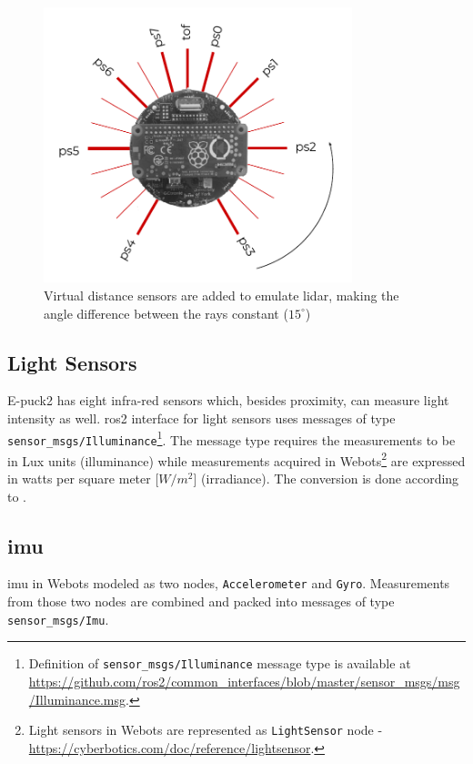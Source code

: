 \begin{figure}[H]
    \centering
    \includegraphics[width=0.8\textwidth]{simulation/figures/laserscan.pdf}
    \caption{Virtual distance sensors are added to emulate \ac{lidar}, making the angle difference between the rays constant ($15^\circ$)}
    \label{fig:simulation:laserscan}
\end{figure}

\subsection{Light Sensors}
E-puck2 has eight infra-red sensors which, besides proximity, can measure light intensity as well.
\ac{ros2} interface for light sensors uses messages of type \texttt{sensor\_msgs/Illuminance}\footnote{Definition of \texttt{sensor\_msgs/Illuminance} message type is available at \url{https://github.com/ros2/common_interfaces/blob/master/sensor_msgs/msg/Illuminance.msg}.}.
The message type requires the measurements to be in Lux units (illuminance) while measurements acquired in Webots\footnote{Light sensors in Webots are represented as \texttt{LightSensor} node - \url{https://cyberbotics.com/doc/reference/lightsensor}.} are expressed in watts per square meter [$W/m^2$] (irradiance). 
The conversion is done according to \cite{michael_conversion_2019}.

\subsection{\acl{imu}}
\ac{imu} in Webots modeled as two nodes, \texttt{Accelerometer} and \texttt{Gyro}.
Measurements from those two nodes are combined and packed into messages of type \texttt{sensor\_msgs/Imu}.

